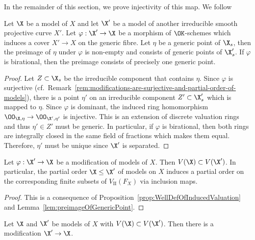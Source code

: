 In the remainder of this section, we prove injectivity of this map.
We follow \cite[Chapter 3]{Rueth}

\begin{lemma}\label{lem:preimageOfGenericPoint}
    Let $\X$ be a model of $X$ and let $\X'$ be a model of another irreducible smooth projective curve $X'$.
    Let $\varphi: \X' \to \X$ be a morphism of $\OK $-schemes which induces a cover $X' \to X$ on the generic fibre.
    Let $\eta$ be a generic point of $\X_s$, then the preimage of $\eta$ under $\varphi$ is non-empty and consists of generic points of $\X_s'$.
    If $\varphi$ is birational, then the preimage consists of precisely one generic point.
\end{lemma}

\begin{proof}{\cite[Lemma 3.6]{Rueth}}
    Let $Z \subset \X_s$ be the irreducible component that contains $\eta$.
    Since $\varphi$ is surjective (cf.\ Remark~\ref{rem:modifications-are-surjective-and-partial-order-of-models}),
    there is a point $\eta'$ on an irreducible component $Z' \subset \X_s'$ which is mapped to $\eta$.
    Since $\varphi$ is dominant, the induced ring homomorphism $\OO_{\X,\eta} \to \OO_{\X',\eta'}$ is injective.
    This is an extension of discrete valuation rings and thus $\eta' \in Z'$ must be generic.
    In particular, if $\varphi$ is birational, then both rings are integrally closed in the same field of fractions which makes them equal.
    Therefore, $\eta'$ must be unique since $\X'$ is separated.
\end{proof}

\begin{lemma}\label{lemma:induced-order-on-valuations}
    Let $\varphi: \X' \to \X$ be a modification of models of $X$.
    Then $V(\X) \subset V(\X')$.
    In particular, the partial order $\X \leq \X'$ of models on $X$ induces a partial order on the corresponding finite
    subsets of $V_{\mathrm{II}}(F_X)$ via inclusion maps.
\end{lemma}

\begin{proof}
    This is a consequence of Proposition~\ref{prop:WellDefOfInducedValuation} and Lemma~\ref{lem:preimageOfGenericPoint}.
\end{proof}

\begin{proposition}
    Let $\X$ and $\X'$ be models of $X$ with $V(\X) \subset V(\X')$.
    Then there is a modification $\X' \to \X$.
\end{proposition}

